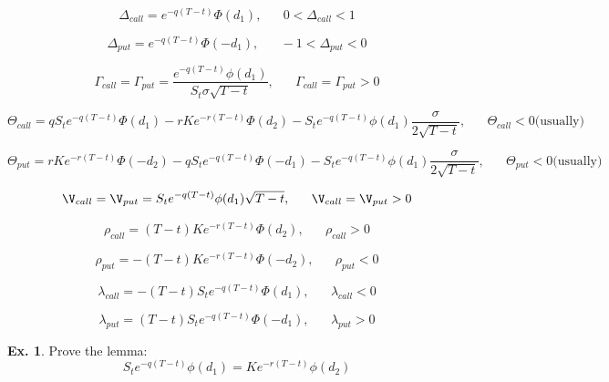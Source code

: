 \documentclass[11pt,a4paper]{book}
\theoremstyle{definition}\newtheorem{definition}{Definition}
\theoremstyle{definition}\newtheorem{fact}{Fact}
\theoremstyle{definition}\newtheorem{remark}{Remark}
\theoremstyle{definition}\newtheorem{ex}{Ex.}
\theoremstyle{definition}\newtheorem{project}{Project}
\theoremstyle{definition}\newtheorem{problem}{Problem}
\theoremstyle{definition}\newtheorem{example}{Example}
\numberwithin{theorem}{section}
\numberwithin{corollary}{chapter}
\numberwithin{assumption}{chapter}
\numberwithin{definition}{chapter}
\numberwithin{prop}{chapter}
\numberwithin{notation}{chapter}
\numberwithin{problem}{chapter}
\numberwithin{example}{chapter}
\numberwithin{fact}{chapter}
\numberwithin{ex}{chapter}
\begin{document}
$$\Delta_{call} = e^{-q(T-t)}\Phi(d_1), \,\,\,\,\,\,\,\,\,\, 0 < \Delta_{call} < 1 $$

$$\Delta_{put} = e^{-q(T-t)}\Phi(-d_1), \,\,\,\,\,\,\,\,\,\, -1 < \Delta_{put} < 0 $$

$$\Gamma_{call} =  \Gamma_{put} = \frac{e^{-q(T-t)}\phi(d_1)}{S_t \sigma \sqrt{T-t}}, \,\,\,\,\,\,\,\,\,\, \Gamma_{call} = \Gamma_{put} > 0 $$

$$\Theta_{call} = qS_te^{-q(T-t)}\Phi(d_1) - rKe^{-r(T-t)}\Phi(d_2) - S_t e^{-q(T-t)}\phi(d_1)\frac{\sigma}{2\sqrt{T-t}}, \,\,\,\,\,\,\,\,\,\, \Theta_{call} < 0 \text{(usually)} $$

$$\Theta_{put} = rKe^{-r(T-t)}\Phi(-d_2)- qS_te^{-q(T-t)}\Phi(-d_1) - S_t e^{-q(T-t)}\phi(d_1)\frac{\sigma}{2\sqrt{T-t}}, \,\,\,\,\,\,\,\,\,\, \Theta_{put} < 0 \text{(usually)} $$

$$\V_{call} =  \V_{put} = S_t e^{-q(T-t)}\phi(d_1)\sqrt{T-t}, \,\,\,\,\,\,\,\,\,\, \V_{call} = \V_{put} > 0 $$

$$\rho_{call} = (T-t)Ke^{-r(T-t)}\Phi(d_2), \,\,\,\,\,\,\,\,\,\, \rho_{call} > 0 $$

$$\rho_{put} = -(T-t)Ke^{-r(T-t)}\Phi(-d_2), \,\,\,\,\,\,\,\,\,\, \rho_{put} < 0 $$

$$\lambda_{call} = -(T-t)S_te^{-q(T-t)}\Phi(d_1), \,\,\,\,\,\,\,\,\,\, \lambda_{call} < 0 $$

$$\lambda_{put} = (T-t)S_te^{-q(T-t)}\Phi(-d_1), \,\,\,\,\,\,\,\,\,\, \lambda_{put} > 0 $$

\begin{ex}
Prove the lemma:
$$ S_t e^{-q(T-t)}\phi(d_1) = Ke^{-r(T-t)}\phi(d_2) $$
\end{ex}

	
	
	
	
\end{document}
